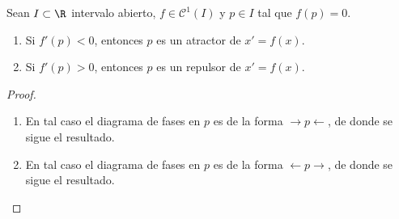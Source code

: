 \documentclass{article}
\begin{document}
\begin{prop}
  Sean $I \subset \R$ intervalo abierto, $f \in \mathcal{C}^1(I)$ y $p\in I$ tal que $f(p) = 0$.
  
\begin{enumerate}
\item Si $f'(p) < 0$, entonces $p$ es un atractor de $x' = f(x)$.
\item Si $f'(p) > 0$, entonces $p$ es un repulsor de $x' = f(x)$.
\end{enumerate}
\end{prop}
\begin{proof}
\begin{enumerate}
\item En tal caso el diagrama de fases en $p$ es de la forma $\rightarrow p \leftarrow$, de donde se sigue el resultado.
\item En tal caso el diagrama de fases en $p$ es de la forma $\leftarrow p \rightarrow$, de donde se sigue el resultado. \qedhere
\end{enumerate}
\end{proof}
\end{document}
